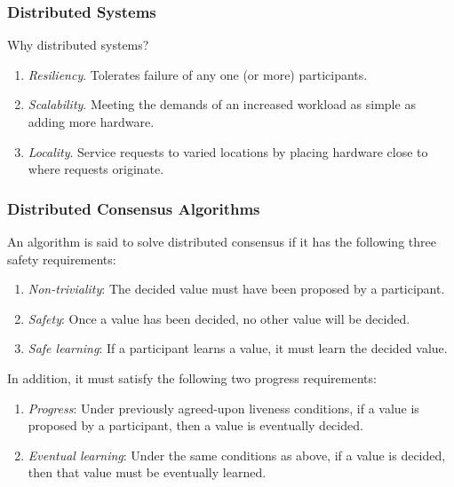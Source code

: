 \documentclass[aspectratio=169,compress,handout]{beamer}
\begin{document}
  \begin{frame}
    \frametitle{Distributed Systems}
    Why distributed systems?
    \begin{enumerate}
      \item \emph{Resiliency}. Tolerates failure of any one (or more)
        participants.
      \item \emph{Scalability}. Meeting the demands of an increased workload as
        simple as adding more hardware.
      \item \emph{Locality}. Service requests to varied locations by placing
        hardware close to where requests originate.
    \end{enumerate}
  \end{frame}

  \begin{frame}
    \frametitle{Distributed Consensus Algorithms}
    \begin{definition}
      An algorithm is said to solve distributed consensus if it has the following
      three safety requirements:
      \begin{enumerate}
        \item<2-> \emph{Non-triviality}: The decided value must have been proposed by a
          participant.
        \item<3-> \emph{Safety}: Once a value has been decided, no other value will be
          decided.
        \item<4-> \emph{Safe learning}: If a participant learns a value, it must learn
          the decided value.
      \end{enumerate}
      In addition, it must satisfy the following two progress requirements:
      \begin{enumerate}
        \item<5-> \emph{Progress}: Under previously agreed-upon liveness conditions, if
          a value is proposed by a participant, then a value is eventually decided.
        \item<6-> \emph{Eventual learning}: Under the same conditions as above, if a
          value is decided, then that value must be eventually learned.
      \end{enumerate}
    \end{definition}
  \end{frame}
\end{document}
